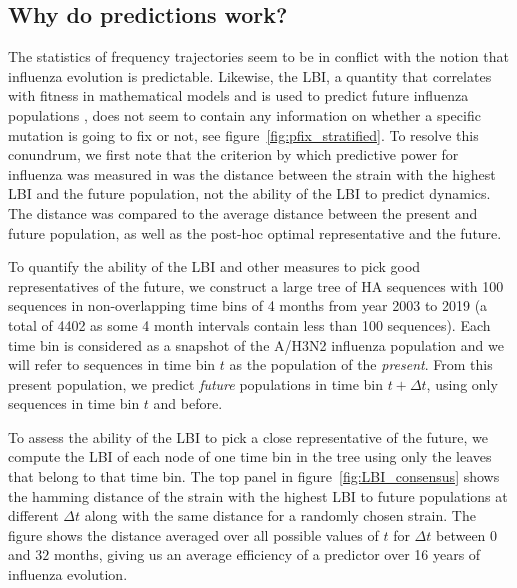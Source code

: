 \documentclass[reprint,amsmath,amssymb,superscriptaddress,showpacs,rmp]{revtex4-1}
\begin{document}
\subsection*{Why do predictions work?}
The statistics of frequency trajectories seem to be in conflict with the notion that influenza evolution is predictable.
Likewise, the LBI, a quantity that correlates with fitness in mathematical models and is used to predict future influenza populations \citep{neher_predicting_2014}, does not seem to contain any information on whether a specific mutation is going to fix or not, see figure~\ref{fig:pfix_stratified}.
To resolve this conundrum, we first note that the criterion by which predictive power for influenza was measured in \citep{neher_predicting_2014} was the distance between the strain with the highest LBI and the future population, not the ability of the LBI to predict dynamics.
The distance was compared to the average distance between the present and future population, as well as the post-hoc optimal representative and the future.

To quantify the ability of the LBI and other measures to pick good representatives of the future, we construct a large tree of HA sequences with 100 sequences in non-overlapping time bins of 4 months from year 2003 to 2019 (a total of 4402 as some 4 month intervals contain less than 100 sequences).
Each time bin is considered as a snapshot of the A/H3N2 influenza population and we will refer to sequences in time bin $t$ as the population of the \emph{present}.
From this present population, we predict \emph{future} populations in time bin $t+\Delta t$, using only sequences in time bin $t$ and before.

To assess the ability of the LBI to pick a close representative of the future, we compute the LBI of each node of one time bin in the tree using only the leaves that belong to that time bin.
The top panel in figure~\ref{fig:LBI_consensus} shows the hamming distance of the strain with the highest LBI to future populations at different $\Delta t$ along with the same distance for a randomly chosen strain.
The figure shows the distance averaged over all possible values of $t$ for $\Delta t$ between $0$ and $32$ months, giving us an average efficiency of a predictor over 16 years of influenza evolution.
\end{document}
